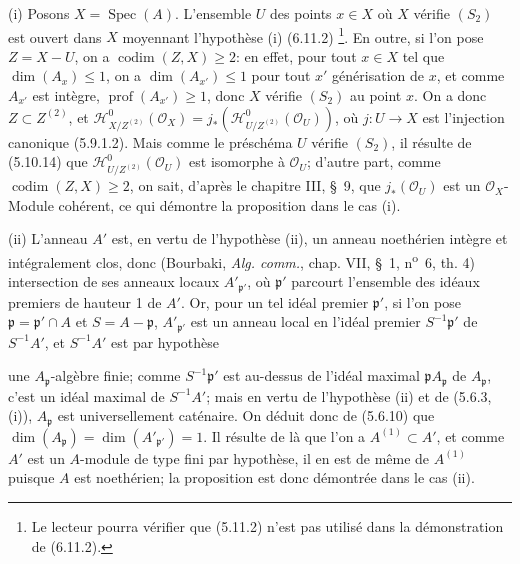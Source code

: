 (i) Posons $X=\operatorname{Spec}(A)$. L'ensemble $U$ des points $x\in X$ où
$X$ vérifie $(S_2)$ est ouvert dans $X$ moyennant l'hypothèse (i) (6.11.2)
\footnote{Le lecteur pourra vérifier que (5.11.2) n'est pas utilisé dans la
démonstration de (6.11.2).}. En outre, si l'on pose $Z=X-U$, on a
$\operatorname{codim}(Z,X)\geq2$: en effet, pour tout $x\in X$ tel que
$\dim(A_x)\leq1$, on a $\dim(A_{x'})\leq1$ pour tout $x'$ générisation de
$x$, et comme $A_{x'}$ est intègre, $\operatorname{prof}(A_{x'})\geq1$, donc
$X$ vérifie $(S_2)$ au point $x$. On a donc $Z\subset Z^{(2)}$, et
$\mathcal H^0_{X/Z^{(2)}}(\mathcal O_X)
=j_*(\mathcal H^0_{U/Z^{(2)}}(\mathcal O_U))$, où $j:U\to X$ est l'injection
canonique (5.9.1.2). Mais comme le préschéma $U$ vérifie $(S_2)$, il résulte de
(5.10.14) que $\mathcal H^0_{U/Z^{(2)}}(\mathcal O_U)$ est isomorphe à
$\mathcal O_U$; d'autre part, comme $\operatorname{codim}(Z,X)\geq2$, on sait,
d'après le chapitre III, \S~9, que $j_*(\mathcal O_U)$ est un
$\mathcal O_X$-Module cohérent, ce qui démontre la proposition dans le cas
(i).

(ii) L'anneau $A'$ est, en vertu de l'hypothèse (ii), un anneau noethérien
intègre et intégralement clos, donc (Bourbaki, \emph{Alg. comm.}, chap. VII,
\S~1, n\textsuperscript{o}~6, th. 4) intersection de ses anneaux locaux
$A'_{\mathfrak p'}$, où $\mathfrak p'$ parcourt l'ensemble des idéaux premiers
de hauteur 1 de $A'$. Or, pour un tel idéal premier $\mathfrak p'$, si l'on
pose $\mathfrak p=\mathfrak p'\cap A$ et $S=A-\mathfrak p$,
$A'_{\mathfrak p'}$ est un anneau local en l'idéal premier
$S^{-1}\mathfrak p'$ de $S^{-1}A'$, et $S^{-1}A'$ est par hypothèse


une $A_\mathfrak p$-algèbre finie; comme $S^{-1}\mathfrak p'$ est au-dessus
de l'idéal maximal $\mathfrak pA_\mathfrak p$ de $A_\mathfrak p$, c'est un
idéal maximal de $S^{-1}A'$; mais en vertu de l'hypothèse (ii) et de (5.6.3,
(i)), $A_\mathfrak p$ est universellement caténaire. On déduit donc de
(5.6.10) que
$\dim(A_\mathfrak p)=\dim(A'_{\mathfrak p'})=1$. Il résulte de là que l'on a
$A^{(1)}\subset A'$, et comme $A'$ est un $A$-module de type fini par
hypothèse, il en est de même de $A^{(1)}$ puisque $A$ est noethérien; la
proposition est donc démontrée dans le cas (ii).

